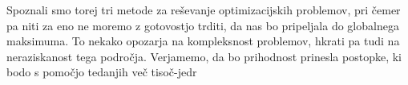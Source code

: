 \documentclass[a4paper,10pt]{article}
\begin{document}
Spoznali smo torej tri metode za reševanje optimizacijskih problemov, pri čemer pa niti za eno ne moremo z gotovostjo trditi, da nas bo pripeljala do globalnega maksimuma. To nekako opozarja na kompleksnost problemov, hkrati pa tudi na neraziskanost tega področja. Verjamemo, da bo prihodnost prinesla postopke, ki bodo s pomočjo tedanjih več tisoč-jedr
\end{document}
